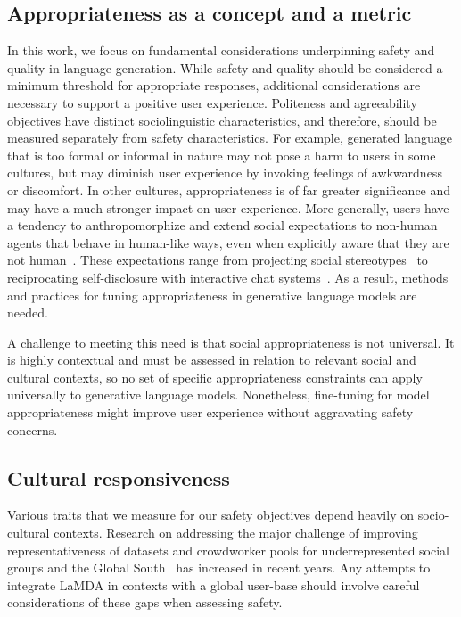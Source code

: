 \subsection{Appropriateness as a concept and a metric} In this work, we focus on fundamental considerations underpinning safety and quality in language generation. While safety and quality should be considered a minimum threshold for appropriate responses, additional considerations are necessary to support a positive user experience. Politeness and agreeability objectives have distinct sociolinguistic characteristics, and therefore, should be measured separately from safety characteristics. For example, generated language that is too formal or informal in nature may not pose a harm to users in some cultures, but may diminish user experience by invoking feelings of awkwardness or discomfort. In other cultures, appropriateness is of far greater significance and may have a much stronger impact on user experience. More generally, users have a tendency to anthropomorphize and extend social expectations to non-human agents that behave in human-like ways, even when explicitly aware that they are not human~\cite{nass2000}. These expectations range from projecting social stereotypes~\cite{https://doi.org/10.1111/j.1559-1816.1997.tb00275.x} to reciprocating self-disclosure with interactive chat systems~\cite{nass2000}. As a result, methods and practices for tuning appropriateness in generative language models are needed.

A challenge to meeting this need is that social appropriateness is not universal. It is highly contextual and must be assessed in relation to relevant social and cultural contexts, so no set of specific appropriateness constraints can apply universally to generative language models. Nonetheless, fine-tuning for model appropriateness might improve user experience without aggravating safety concerns.

\subsection{Cultural responsiveness} Various traits that we measure for our safety objectives depend heavily on socio-cultural contexts. Research on addressing the major challenge of improving representativeness of datasets and crowdworker pools for underrepresented social groups and the Global South~\cite{martin2020} has increased in recent years. Any attempts to integrate LaMDA in contexts with a global user-base should involve careful considerations of these gaps when assessing safety.


